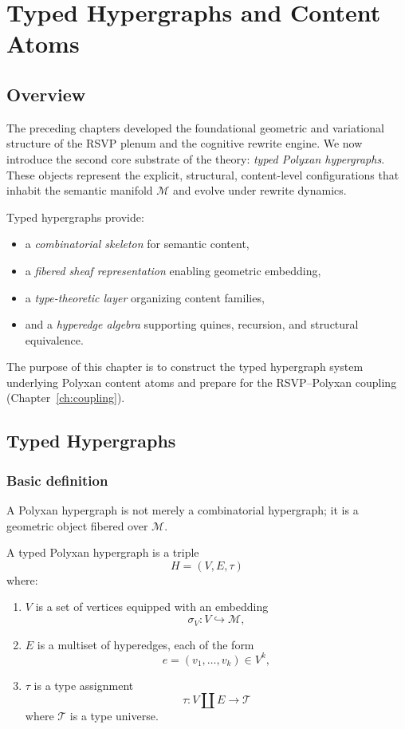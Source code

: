 \chapter{Typed Hypergraphs and Content Atoms}
\label{ch:typed-hypergraphs}

\section{Overview}

The preceding chapters developed the foundational geometric and variational
structure of the RSVP plenum and the cognitive rewrite engine.
We now introduce the second core substrate of the theory:
\emph{typed Polyxan hypergraphs}. These objects represent the explicit,
structural, content-level configurations that inhabit the semantic manifold
$\mathcal{M}$ and evolve under rewrite dynamics.

Typed hypergraphs provide:
\begin{itemize}
  \item a \emph{combinatorial skeleton} for semantic content,
  \item a \emph{fibered sheaf representation} enabling geometric embedding,
  \item a \emph{type-theoretic layer} organizing content families,
  \item and a \emph{hyperedge algebra} supporting quines, recursion, and
        structural equivalence.
\end{itemize}

The purpose of this chapter is to construct the typed hypergraph system
underlying Polyxan content atoms and prepare for the RSVP--Polyxan coupling
(Chapter~\ref{ch:coupling}).

\section{Typed Hypergraphs}

\subsection{Basic definition}

A Polyxan hypergraph is not merely a combinatorial hypergraph; it is a geometric
object fibered over $\mathcal{M}$.

\begin{definition}
A typed Polyxan hypergraph is a triple
\[
H = (V,E,\tau)
\]
where:
\begin{enumerate}
  \item $V$ is a set of vertices equipped with an embedding
        \[
        \sigma_V : V \hookrightarrow \mathcal{M},
        \]
  \item $E$ is a multiset of hyperedges, each of the form
        \[
        e = (v_1,\dots,v_k)\in V^k,
        \]
  \item $\tau$ is a type assignment
        \[
        \tau : V\amalg E \to \mathcal{T}
        \]
        where $\mathcal{T}$ is a type universe.
\end{enumerate}
\end{definition}

